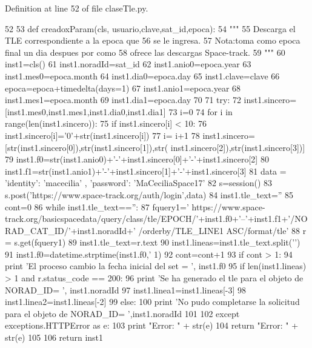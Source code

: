 \-Definition at line 52 of file clase\-Tle.\-py.


\begin{DoxyCode}
52 
53     def creadoxParam(cls, usuario,clave,sat_id,epoca):
54         """
55         Descarga el TLE correspondiente a la epoca que
56         se le ingresa.
57         Nota:toma como epoca final un dia despues por como 
58         ofrece las descargas Space-track.
59         """
60         inst1=cls()
61         inst1.noradId=sat_id
62         inst1.anio0=epoca.year
63         inst1.mes0=epoca.month
64         inst1.dia0=epoca.day
65         inst1.clave=clave
66         epoca=epoca+timedelta(days=1)
67         inst1.anio1=epoca.year
68         inst1.mes1=epoca.month
69         inst1.dia1=epoca.day
70         
71         try:
72             inst1.sincero=[inst1.mes0,inst1.mes1,inst1.dia0,inst1.dia1]
73             i=0
74             for i in range(len(inst1.sincero)):           
75                 if inst1.sincero[i] < 10:
76                     inst1.sincero[i]='0'+str(inst1.sincero[i])
77                 i= i+1
78             inst1.sincero=[str(inst1.sincero[0]),str(inst1.sincero[1]),str(
      inst1.sincero[2]),str(inst1.sincero[3])]
79             inst1.f0=str(inst1.anio0)+'-'+inst1.sincero[0]+'-'+inst1.sincero[2]
80             inst1.f1=str(inst1.anio1)+'-'+inst1.sincero[1]+'-'+inst1.sincero[3]
81             data = {'identity': 'macecilia' , 'password': 'MaCeciliaSpace17'}
82             s=session() 
83             s.post('https://www.space-track.org/auth/login',data)
84             inst1.tle_text=''
85             cont=0
86             while inst1.tle_text=='':
87                 fquery1='
      https://www.space-track.org/basicspacedata/query/class/tle/EPOCH/'+inst1.f0+'--'+inst1.f1+'/NORAD_CAT_ID/'+inst1.noradId+'
      /orderby/TLE_LINE1 ASC/format/tle'
88                 r = s.get(fquery1)
89                 inst1.tle_text=r.text
90                 inst1.lineas=inst1.tle_text.split('\n')
91                 inst1.f0=datetime.strptime(inst1.f0,'%
      1)
92                 cont=cont+1
93             if cont > 1:
94                     print 'El proceso cambio la fecha inicial del set = ', 
      inst1.f0
95             if len(inst1.lineas) > 1 and r.status_code == 200:
96                 print 'Se ha generado el tle para el objeto de NORAD_ID= ',
      inst1.noradId
97                 inst1.linea1=inst1.lineas[-3]
98                 inst1.linea2=inst1.lineas[-2]
99             else:
100                 print 'No pudo completarse la solicitud para el objeto de
       NORAD_ID= ',inst1.noradId                      
101     
102         except exceptions.HTTPError as e:
103             print "Error: " + str(e)
104             return "Error: " + str(e)
105 
106         return inst1
    
\end{DoxyCode}
